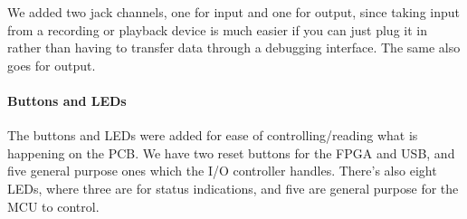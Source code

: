We added two jack channels, one for input and one for output, since taking input
from a recording or playback device is much easier if you can just plug it in
rather than having to transfer data through a debugging interface. The same also
goes for output.

\paragraph{Buttons and LEDs}

The buttons and LEDs were added for ease of controlling/reading what is
happening on the PCB. We have two reset buttons for the FPGA and USB, and five
general purpose ones which the I/O controller handles. There's also eight LEDs, where
three are for status indications, and five are general purpose for the MCU to
control.
